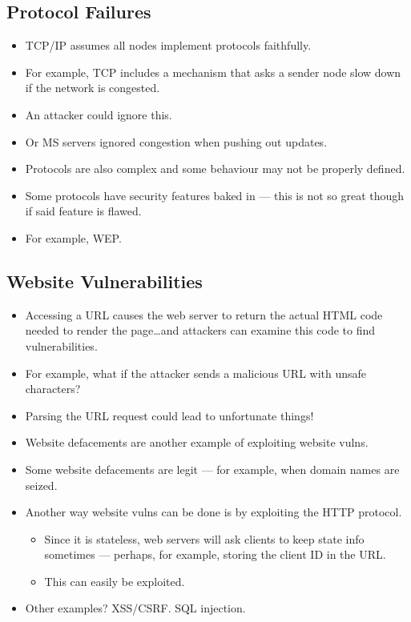 \documentclass{article}
\begin{document}
\subsection{Protocol Failures}
\begin{itemize}
    \item TCP/IP assumes all nodes implement protocols faithfully.
    \item For example, TCP includes a mechanism that asks a sender node slow down if the network is congested.
    \item An attacker could ignore this.
    \item Or MS servers ignored congestion when pushing out updates.
    \item Protocols are also complex and some behaviour may not be properly defined.
    \item Some protocols have security features baked in --- this is not so great though if said feature is flawed.
    \item For example, WEP.
\end{itemize}

\subsection{Website Vulnerabilities}
\begin{itemize}
    \item Accessing a URL causes the web server to return the actual HTML code needed to render the page\dots and attackers can examine this code to find vulnerabilities.
    \item For example, what if the attacker sends a malicious URL with unsafe characters?
    \item Parsing the URL request could lead to unfortunate things!
    \item Website defacements are another example of exploiting website vulns.
    \item Some website defacements are legit --- for example, when domain names are seized.
    \item Another way website vulns can be done is by exploiting the HTTP protocol.
        \begin{itemize}
            \item Since it is stateless, web servers will ask clients to keep state info sometimes --- perhaps, for example, storing the client ID in the URL.
            \item This can easily be exploited.
        \end{itemize}
    \item Other examples?  XSS/CSRF.  SQL injection.
\end{itemize}
\end{document}
